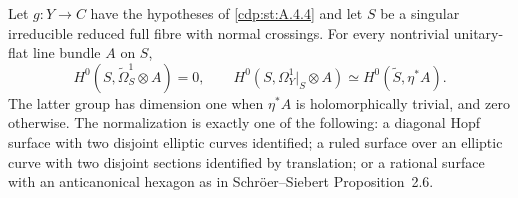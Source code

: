 
\begin{proposition}\label{cdp:st:A.4.5}
Let $g:Y\to C$ have the hypotheses of \ref{cdp:st:A.4.4} and let $S$ be a singular irreducible reduced full fibre with normal crossings. For every nontrivial unitary-flat line bundle $A$ on $S$,
\[
H^0(S,\widetilde\Omega_S^1\otimes A)=0,
\qquad
H^0(S,\Omega_Y^1|_S\otimes A)
 \simeq H^0(\widetilde S,\eta^*A).
\tag{A.17}\label{cdp:eq:A.17}
\]
The latter group has dimension one when $\eta^*A$ is holomorphically trivial, and zero otherwise. The normalization is exactly one of the following: a diagonal Hopf surface with two disjoint elliptic curves identified; a ruled surface over an elliptic curve with two disjoint sections identified by translation; or a rational surface with an anticanonical hexagon as in Schr\"oer--Siebert Proposition~2.6.
\end{proposition}
